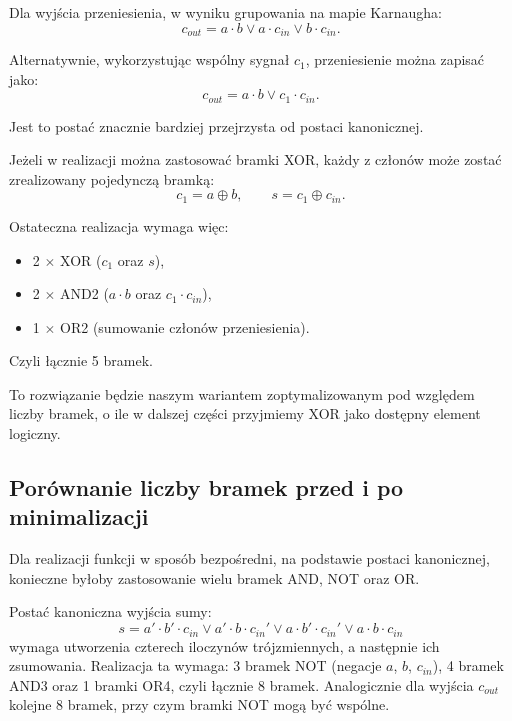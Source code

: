 \documentclass[12pt,a4paper]{article}
\begin{document}
Dla wyjścia przeniesienia, w wyniku grupowania na mapie Karnaugha:
\begin{equation*}
c_{out} = a \cdot b \vee a \cdot c_{in} \vee b \cdot c_{in}.
\end{equation*}

Alternatywnie, wykorzystując wspólny sygnał $c_1$, przeniesienie można zapisać jako:
\begin{equation*}
c_{out} = a \cdot b \vee c_1 \cdot c_{in}.
\end{equation*}

Jest to postać znacznie bardziej przejrzysta od postaci kanonicznej.

Jeżeli w realizacji można zastosować bramki XOR, każdy z członów może zostać zrealizowany pojedynczą bramką:
\begin{equation*}
c_1 = a \oplus b, \qquad s = c_1 \oplus c_{in}.
\end{equation*}

Ostateczna realizacja wymaga więc:
\begin{itemize}
    \item 2 $\times$ XOR ($c_1$ oraz $s$),
    \item 2 $\times$ AND2 ($a \cdot b$ oraz $c_1 \cdot c_{in}$),
    \item 1 $\times$ OR2 (sumowanie członów przeniesienia).
\end{itemize}

Czyli łącznie 5 bramek.

To rozwiązanie będzie naszym wariantem zoptymalizowanym pod względem liczby bramek, o ile w dalszej części przyjmiemy XOR jako dostępny element logiczny.

\subsection{Porównanie liczby bramek przed i po minimalizacji}

Dla realizacji funkcji w sposób bezpośredni, na podstawie postaci kanonicznej, konieczne byłoby zastosowanie wielu bramek AND, NOT oraz OR.

Postać kanoniczna wyjścia sumy:
\begin{equation*}
s = a' \cdot b' \cdot c_{in} \vee a' \cdot b \cdot c_{in}' \vee a \cdot b' \cdot c_{in}' \vee a \cdot b \cdot c_{in}
\end{equation*}
wymaga utworzenia czterech iloczynów trójzmiennych, a następnie ich zsumowania. Realizacja ta wymaga: 3 bramek NOT (negacje $a$, $b$, $c_{in}$), 4 bramek AND3 oraz 1 bramki OR4, czyli łącznie 8 bramek. Analogicznie dla wyjścia $c_{out}$ kolejne 8 bramek, przy czym bramki NOT mogą być wspólne.
\end{document}
